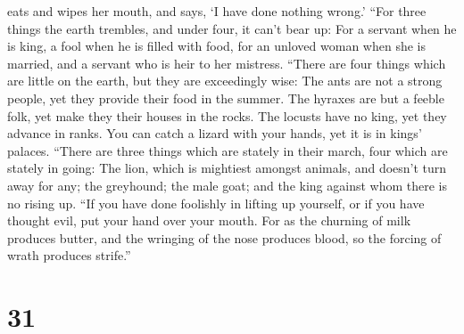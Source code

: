 eats and wipes her mouth, and says, `I have done nothing wrong.'
 ``For three things the earth trembles, and under four, it
can't bear up:  For a servant when he is king, a fool when
he is filled with food,  for an unloved woman when she is
married, and a servant who is heir to her mistress. 
``There are four things which are little on the earth, but they are
exceedingly wise:  The ants are not a strong people, yet
they provide their food in the summer.  The hyraxes are but
a feeble folk, yet make they their houses in the rocks. 
The locusts have no king, yet they advance in ranks.  You
can catch a lizard with your hands, yet it is in kings' palaces.
 ``There are three things which are stately in their march,
four which are stately in going:  The lion, which is
mightiest amongst animals, and doesn't turn away for any; 
the greyhound; the male goat; and the king against whom there is no
rising up.  ``If you have done foolishly in lifting up
yourself, or if you have thought evil, put your hand over your mouth.
 For as the churning of milk produces butter, and the
wringing of the nose produces blood, so the forcing of wrath produces
strife.''

\hypertarget{section-25}{%
\section{31}\label{section-25}}

